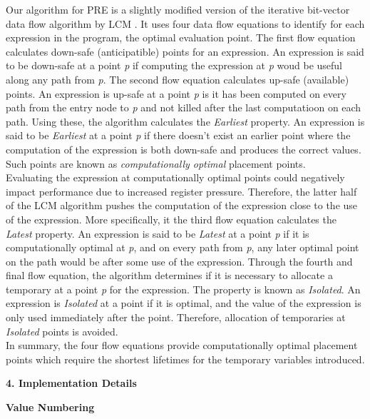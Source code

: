 \documentclass[10pt,twoside]{report}
\begin{document}
Our algorithm for PRE is a slightly modified version of the iterative bit-vector data flow
algorithm by LCM \cite{Knoop}. It uses four data flow equations to identify for each expression
in the program, the optimal evaluation point. The first flow equation calculates down-safe (anticipatible) points 
for an expression. An expression is said to be down-safe at a point \emph{p} if computing the 
expression at \emph{p} woud be useful along any path from \emph{p}. The second flow equation 
calculates up-safe (available) points. An expression is up-safe at a point \emph{p} is it has been computed
on every path from the entry node to \emph{p} and not killed after the last computatioon on each 
path. Using these, the algorithm calculates the \emph{Earliest} property. An expression is said to
be \emph{Earliest} at a point \emph{p} if there doesn't exist an earlier point where the computation
of the expression is both down-safe and produces the correct values. Such points are known
as \emph{computationally optimal} placement points. \\

Evaluating the expression at computationally optimal points could negatively impact
performance due to increased register pressure. Therefore, the latter half of the LCM algorithm pushes 
the computation of the expression close to the use of the expression.
More specifically, it the third flow equation calculates the \emph{Latest} property. An expression is 
said to be \emph{Latest} at a point \emph{p} if it is computationally optimal at \emph{p}, and on every
path from \emph{p}, any later optimal point on the path would be after some use of the expression.
Through the fourth and final flow equation, the algorithm determines if it is necessary to allocate a 
temporary at a point \emph{p} for the expression. The property is known as \emph{Isolated}. An expression
is \emph{Isolated} at a point if it is optimal, and the value of the expression is only used immediately 
after the point. Therefore, allocation of temporaries at \emph{Isolated} points is avoided.\\

In summary, the four flow equations provide computationally optimal 
placement points which require the shortest lifetimes for the temporary variables introduced.

\begin{flushleft}
\textbf{\Large{4. Implementation Details}}
\end{flushleft}

\begin{flushleft}
\textbf{\large{Value Numbering}}
\end{flushleft}
\end{document}
